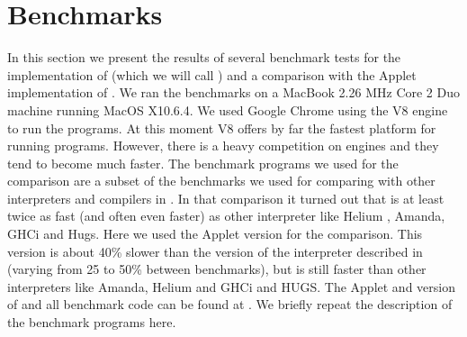 \section{Benchmarks} \label{sapljs:sec:benchmarks}
In this section we present the results of several benchmark tests for the  \JavaScript implementation of \Sapl (which we will call \Sapljs) and a
comparison with the \Java Applet implementation of \Sapl. 
We ran the benchmarks on a MacBook 2.26 MHz Core 2 Duo machine running MacOS X10.6.4.
We used Google Chrome using the V8 \JavaScript engine to run the programs.
At this moment V8 offers by far the fastest platform for running \Sapljs programs.
However, there is a heavy competition on \JavaScript engines and they tend to become much faster.
The benchmark programs we used for the comparison are a subset of the benchmarks  we used for comparing 
\Sapl with other interpreters and compilers in \cite{JKP}. In that comparison it turned out that \Sapl is at least twice as fast (and often even faster)
as other interpreter like \textsf{Helium} , \textsf{Amanda}, \textsf{GHCi} and \textsf{Hugs}.
Here we used the \Java Applet version for the comparison. This version is about 40\% slower than the \C  version
of the interpreter described in \cite{JKP} (varying from 25 to 50\% between benchmarks), but is still faster than other interpreters like \textsf{Amanda}, \textsf{Helium} and \textsf{GHCi} and \textsf{HUGS}.
The \Java Applet and \JavaScript  version of  \Sapl  and all benchmark code can be found at \cite{SAPL}.
We briefly repeat the description of the benchmark programs here.

